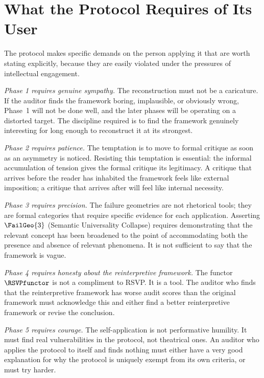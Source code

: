 \section{What the Protocol Requires of Its User}
\label{sec:protocol-requirements}

The protocol makes specific demands on the person
applying it that are worth stating explicitly, because
they are easily violated under the pressures of
intellectual engagement.

\textit{Phase 1 requires genuine sympathy.} The
reconstruction must not be a caricature. If the auditor
finds the framework boring, implausible, or obviously
wrong, Phase~1 will not be done well, and the later
phases will be operating on a distorted target. The
discipline required is to find the framework genuinely
interesting for long enough to reconstruct it at its
strongest.

\textit{Phase 2 requires patience.} The temptation
is to move to formal critique as soon as an asymmetry
is noticed. Resisting this temptation is essential:
the informal accumulation of tension gives the formal
critique its legitimacy. A critique that arrives before
the reader has inhabited the framework feels like
external imposition; a critique that arrives after
will feel like internal necessity.

\textit{Phase 3 requires precision.} The failure
geometries are not rhetorical tools; they are formal
categories that require specific evidence for each
application. Asserting $\FailGeo{3}$ (Semantic
Universality Collapse) requires demonstrating that
the relevant concept has been broadened to the point
of accommodating both the presence and absence of
relevant phenomena. It is not sufficient to say that
the framework is vague.

\textit{Phase 4 requires honesty about the reinterpretive
framework.} The functor $\RSVPfunctor$ is not a
compliment to RSVP. It is a tool. The auditor who
finds that the reinterpretive framework has worse audit
scores than the original framework must acknowledge
this and either find a better reinterpretive framework
or revise the conclusion.

\textit{Phase 5 requires courage.} The self-application
is not performative humility. It must find real
vulnerabilities in the protocol, not theatrical ones.
An auditor who applies the protocol to itself and finds
nothing must either have a very good explanation for
why the protocol is uniquely exempt from its own
criteria, or must try harder.

